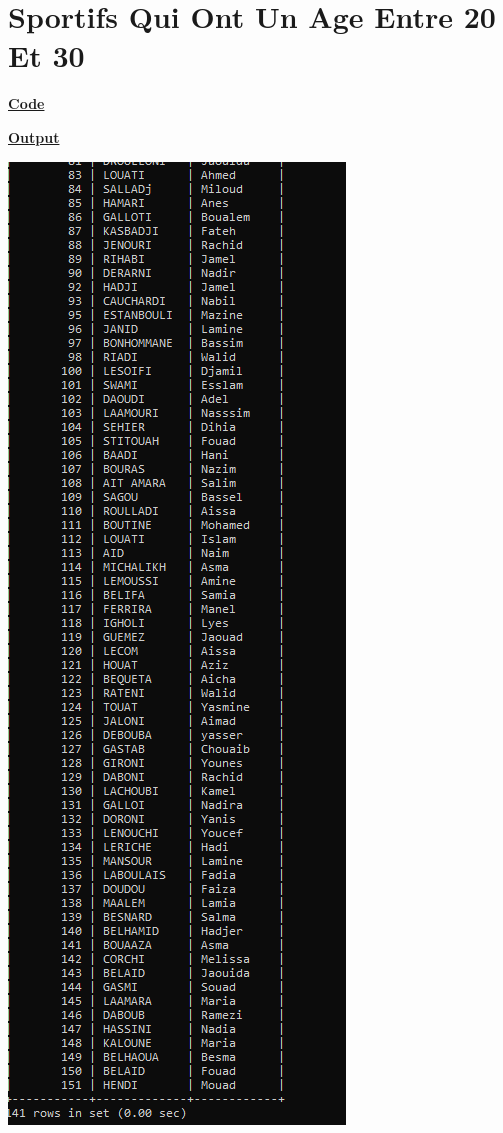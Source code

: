 \newpage
{}
\section{Sportifs Qui Ont Un Age Entre 20 Et 30}

\vspace{0.25cm}
\textbf{\underline{Code}}



\vspace{0.25cm}
\textbf{\underline{Output}}

\vspace{0.25cm}
\begin{center}
    \includegraphics[height=0.6\textheight]{Parties/Partie3/sportifs.PNG}
\end{center}

